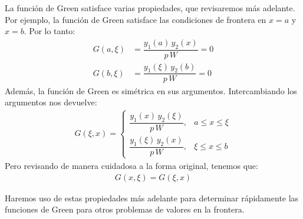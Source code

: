 La función de Green satisface varias propiedades, que revisaremos más adelante. Por ejemplo, la función de Green satisface las condiciones de frontera en $x = a$ y $x = b$. Por lo tanto:
\begin{align*}
G (a, \xi) &= \dfrac{y_{1} (a) \, y_{2} (x)}{p \, W} = 0 \\[0.5em]        
G (b, \xi) &= \dfrac{y_{1} (\xi) \, y_{2} (b)}{p \, W} = 0
\end{align*}
Además, la función de Green es simétrica en sus argumentos. Intercambiando los argumentos nos devuelve:
\begin{align}
G (\xi, x) = \begin{cases}
\dfrac{y_{1} (x) \, y_{2} (\xi)}{p \, W}, & a \leq x \leq \xi \\[0.5em]
\dfrac{y_{1} (\xi) \, y_{2} (x)}{p \, W}, & \xi \leq x \leq b
\end{cases}
\label{eq:ecuacion_07_34}
\end{align}    
Pero revisando de manera cuidadosa a la forma original, tenemos que:
\begin{align*}
G (x, \xi) = G (\xi, x)
\end{align*}

Haremos uso de estas propiedades más adelante para determinar rápidamente las funciones de Green para otros problemas de valores en la frontera.

